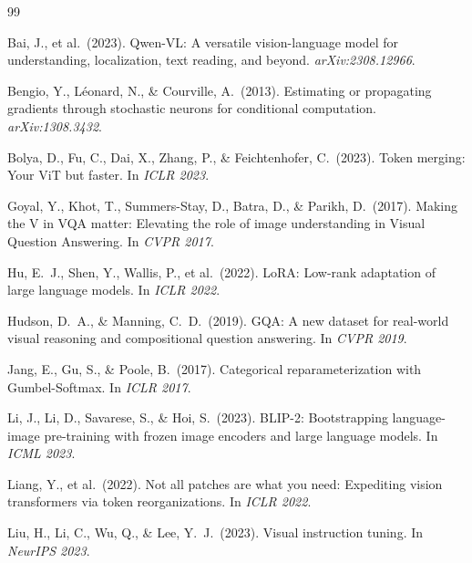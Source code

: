 \documentclass[12pt,a4paper]{article}
\begin{document}

\begin{thebibliography}{99}

Bai, J., et al.\ (2023).
\newblock Qwen-VL: A versatile vision-language model for understanding,
  localization, text reading, and beyond.
\newblock \textit{arXiv:2308.12966}.

Bengio, Y., L\'{e}onard, N., \& Courville, A.\ (2013).
\newblock Estimating or propagating gradients through stochastic neurons for
  conditional computation.
\newblock \textit{arXiv:1308.3432}.

Bolya, D., Fu, C., Dai, X., Zhang, P., \& Feichtenhofer, C.\ (2023).
\newblock Token merging: Your ViT but faster.
\newblock In \textit{ICLR 2023}.

Goyal, Y., Khot, T., Summers-Stay, D., Batra, D., \& Parikh, D.\ (2017).
\newblock Making the V in VQA matter: Elevating the role of image understanding
  in Visual Question Answering.
\newblock In \textit{CVPR 2017}.

Hu, E.~J., Shen, Y., Wallis, P., et al.\ (2022).
\newblock LoRA: Low-rank adaptation of large language models.
\newblock In \textit{ICLR 2022}.

Hudson, D.~A., \& Manning, C.~D.\ (2019).
\newblock GQA: A new dataset for real-world visual reasoning and compositional
  question answering.
\newblock In \textit{CVPR 2019}.

Jang, E., Gu, S., \& Poole, B.\ (2017).
\newblock Categorical reparameterization with Gumbel-Softmax.
\newblock In \textit{ICLR 2017}.

Li, J., Li, D., Savarese, S., \& Hoi, S.\ (2023).
\newblock BLIP-2: Bootstrapping language-image pre-training with frozen image
  encoders and large language models.
\newblock In \textit{ICML 2023}.

Liang, Y., et al.\ (2022).
\newblock Not all patches are what you need: Expediting vision transformers via
  token reorganizations.
\newblock In \textit{ICLR 2022}.

Liu, H., Li, C., Wu, Q., \& Lee, Y.~J.\ (2023).
\newblock Visual instruction tuning.
\newblock In \textit{NeurIPS 2023}.


\end{thebibliography}
\end{document}
